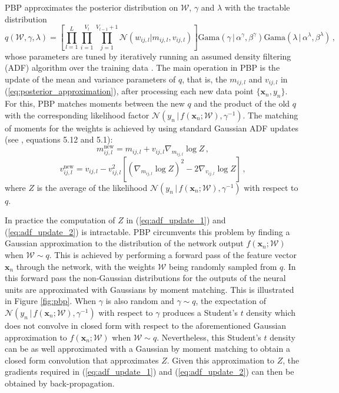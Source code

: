 PBP approximates the posterior distribution on $\mathcal{W}$, $\gamma$ and $\lambda$ with the tractable distribution
\begin{equation}
q(\mathcal{W},\gamma, \lambda) = \left[ \prod_{l=1}^L\! \prod_{i=1}^{V_l}\! 
\prod_{j=1}^{V_{l\!-\!1}\!+\!1} \mathcal{N}(w_{ij,l}| m_{ij,l},v_{ij,l})\right ]
 \text{Gama}(\gamma \,|\, \alpha^\gamma, \beta^\gamma)
\text{Gama}(\lambda \,|\, \alpha^\lambda, \beta^\lambda)\,,\label{eq:posterior_approximation}
\end{equation}
whose parameters are tuned by iteratively running an assumed density filtering (ADF) algorithm over the training data \cite{Opper1998}. The main operation in PBP is the update of the mean and variance parameters of $q$, that is, the $m_{ij,l}$ and $v_{ij,l}$ in
(\ref{eq:posterior_approximation}), after processing each new data point $\{\mathbf{x}_n,y_n\}$. For this, PBP matches moments between the new $q$ and the product of the old $q$ with the corresponding likelihood factor $\mathcal{N}(y_n \,|\, f(\mathbf{x}_n;\mathcal{W}),\gamma^{-1})$. The matching of moments for the weights is achieved by using standard Gaussian ADF updates (see \cite{minka2001family}, equations 5.12 and 5.1):
\begin{equation}
\label{eq:adf_update_1} m_{ij,l}^\text{new} =  m_{ij,l} + v_{ij,l} \nabla_{m_{ij,l}} \log Z \,,
\end{equation}
\begin{equation}
\label{eq:adf_update_2}v_{ij,l}^\text{new} = v_{ij,l} - v_{ij,l}^2 \left[ (\nabla_{m_{ij,l}} \log Z)^2 - 2 \nabla_{v_{ij,l}} \log Z \right]\,,
\end{equation}
where $Z$ is the average of the likelihood $\mathcal{N}(y_n\,|\, f(\mathbf{x}_n;\mathcal{W}),\gamma^{-1})$ with respect to $q$. 

In practice the computation of $Z$ in (\ref{eq:adf_update_1}) and (\ref{eq:adf_update_2}) is intractable. PBP circumvents this problem by finding a Gaussian approximation to the distribution of the network output $f(\mathbf{x}_n;\mathcal{W})$ when $\mathcal{W} \sim q$. This is achieved by performing a forward pass of the feature vector $\mathbf{x}_n$ through the network, with the weights $\mathcal{W}$ being randomly sampled from $q$. In this forward pass the non-Gaussian distributions for the outputs of the neural units are approximated with Gaussians by moment matching. This is illustrated in Figure \ref{fig:pbp}. When $\gamma$ is also random and $\gamma\sim q$, the expectation of $\mathcal{N}(y_n \,|\, f(\mathbf{x}_n;\mathcal{W}),\gamma^{-1})$ with respect to $\gamma$ produces a Student's $t$ density which does not convolve in closed form with respect to the aforementioned Gaussian approximation to $f(\mathbf{x}_n;\mathcal{W})$ when $\mathcal{W} \sim q$. Nevertheless, this Student's $t$ density can be as well approximated with a Gaussian by moment matching to obtain a closed form convolution that approximates $Z$. Given this approximation to $Z$, the gradients required in (\ref{eq:adf_update_1}) and (\ref{eq:adf_update_2}) can then be obtained by back-propagation.

